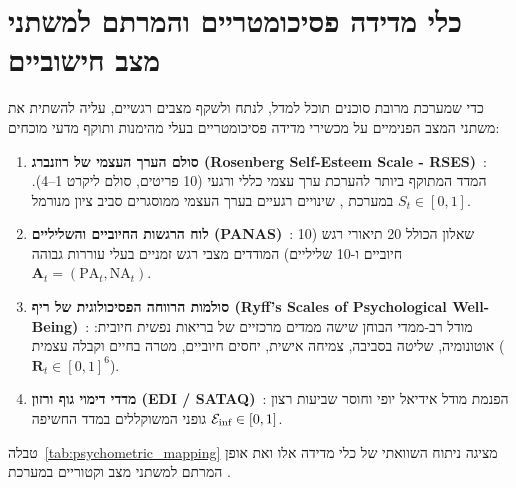 \section{כלי מדידה פסיכומטריים והמרתם למשתני מצב חישוביים}
\label{sec:lit_psychometric_instruments}
כדי שמערכת מרובת סוכנים תוכל למדל, לנתח ולשקף מצבים רגשיים, עליה להשתית את משתני המצב הפנימיים על מכשירי מדידה פסיכומטריים בעלי מהימנות ותוקף מדעי מוכחים:
\begin{enumerate}
    \item \textbf{סולם הערך העצמי של רוזנברג (\textenglish{Rosenberg Self-Esteem Scale - RSES})}~\cite{rosenberg1965society}: המדד המתוקף ביותר להערכת ערך עצמי כללי ורגעי (10 פריטים, סולם ליקרט 1--4). במערכת \projectname{}, שינויים רגעיים בערך העצמי ממוסגרים סביב ציון מנורמל $S_t \in [0, 1]$.
    \item \textbf{לוח הרגשות החיוביים והשליליים (\textenglish{PANAS})}~\cite{watson1988development}: שאלון הכולל 20 תיאורי רגש (10 חיוביים ו-10 שליליים) המודדים מצבי רגש זמניים בעלי עוררות גבוהה $\mathbf{A}_t = (\mathrm{PA}_t, \mathrm{NA}_t)$.
    \item \textbf{סולמות הרווחה הפסיכולוגית של ריף (\textenglish{Ryff's Scales of Psychological Well-Being})}~\cite{ryff1989happiness}: מודל רב-ממדי הבוחן שישה ממדים מרכזיים של בריאות נפשית חיובית: אוטונומיה, שליטה בסביבה, צמיחה אישית, יחסים חיוביים, מטרה בחיים וקבלה עצמית ($\mathbf{R}_t \in [0, 1]^6$).
    \item \textbf{מדדי דימוי גוף ורזון (\textenglish{EDI / SATAQ})}~\cite{perloff2014social}: הפנמת מודל אידיאל יופי וחוסר שביעות רצון גופני המשוקללים במדד החשיפה $\mathcal{E}_{\text{inf}}{} \in [0, 1]$.
\end{enumerate}

טבלה~\ref{tab:psychometric_mapping} מציגה ניתוח השוואתי של כלי מדידה אלו ואת אופן המרתם למשתני מצב וקטוריים במערכת \projectname{}.

